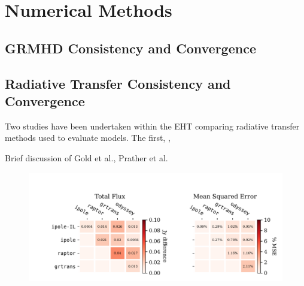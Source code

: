 \section{Numerical Methods}\label{app:numerical}

\subsection{GRMHD Consistency and Convergence}\label{app:resolution_study}





\subsection{Radiative Transfer Consistency and Convergence}
\label{app:radtrans}


Two studies have been undertaken within the EHT comparing radiative transfer methods used to evaluate models.  The first, \cite{2020ApJ...897..148G}, 

Brief discussion of Gold et al., Prather et al.

\begin{figure}
  \centering
  \includegraphics{figures/grmhd_hi_IntegratedUnpolarizeds_plot.pdf}
  \caption{}
  \label{fig:radtrans_grmhd_comp}
\end{figure}

